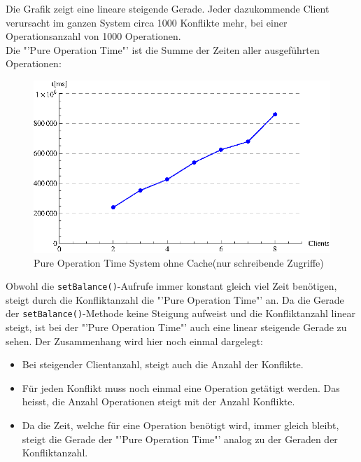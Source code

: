 Die Grafik zeigt eine lineare steigende Gerade. Jeder dazukommende Client verursacht im ganzen System circa 1000 Konflikte mehr, bei einer Operationsanzahl von 1000 Operationen. \\

Die "'Pure Operation Time"' ist die Summe der Zeiten aller ausgeführten Operationen:

\begin{figure}[H]
\begin{center}
\includegraphics[width=\textwidth]{images_MessErgebnisse/incrementRMIPureOperationTime.eps}
\end{center}
\caption{Pure Operation Time System ohne Cache(nur schreibende Zugriffe)}
\end{figure}

Obwohl die \texttt{setBalance()}-Aufrufe immer konstant gleich viel Zeit be\-nö\-t\-i\-gen, steigt durch die Konfliktanzahl die "'Pure Operation Time"' an. Da die Gerade der \texttt{setBalance()}-Methode keine Steigung aufweist und die Konfliktanzahl linear steigt, ist bei der "'Pure Operation Time"' auch eine linear steigende Gerade zu sehen. Der Zusammenhang wird hier noch einmal dargelegt:
\begin{itemize}
\item Bei steigender Clientanzahl, steigt auch die Anzahl der Konflikte.
\item Für jeden Konflikt muss noch einmal eine Operation getätigt werden. Das heisst, die Anzahl Operationen steigt mit der Anzahl Konflikte.
\item Da die Zeit, welche für eine Operation benötigt wird, immer gleich bleibt, steigt die Gerade der "'Pure Operation Time"' analog zu der Geraden der Konfliktanzahl.
\end{itemize}

